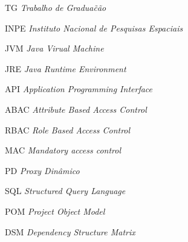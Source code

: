 \begin{siglas}
    \item[TG] \emph{Trabalho de Gradua\~c\~ao}
    \item[INPE] \emph{Instituto Nacional de Pesquisas Espaciais}
    \item[JVM] \emph{Java Virual Machine}
    \item[JRE] \emph{Java Runtime Environment}
    \item[API] \emph{Application Programming Interface}
    \item[ABAC]\emph{Attribute Based Access Control}
    \item[RBAC]\emph{Role Based Access Control}
    \item[MAC]\emph{Mandatory access control}
    \item[PD]\emph{Proxy Dinâmico}
    \item[SQL]\emph{Structured Query Language}
    \item[POM]\emph{Project Object Model}
    \item[DSM]\emph{Dependency Structure Matrix}
\end{siglas}